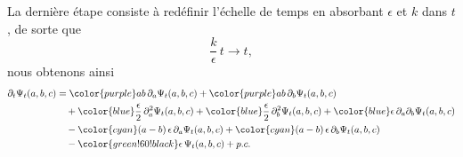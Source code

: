 \documentclass[openany,a4paper,12pt]{article}
\begin{document}
\par La dernière étape consiste à redéfinir l'échelle de temps en absorbant $\epsilon$ et $k$ dans $t$, de sorte que 
%
\begin{equation}\label{moyal_redef_temps}
	\frac{k}{\epsilon} \, t \rightarrow t,
\end{equation}
%
nous obtenons ainsi 
%
\begin{equation}\label{moyal_dev_epsilon_complet}
\begin{split}
	\partial_t \Psi_t(a,b,c) 
	&= {\color{purple} ab \, \partial_a \Psi_t(a,b,c) }
	+ {\color{purple} ab \, \partial_b \Psi_t(a,b,c) }\\
	&\quad + {\color{blue} \frac{\epsilon}{2} \, \partial_a^2 \Psi_t(a,b,c) }
	+ {\color{blue} \frac{\epsilon}{2} \, \partial_b^2 \Psi_t(a,b,c) }
	+ {\color{blue} \epsilon \, \partial_a \partial_b \Psi_t(a,b,c) }\\
	&\quad - {\color{cyan} (a-b) \,\epsilon \, \partial_a \Psi_t(a,b,c) }
	+ {\color{cyan} (a-b) \,\epsilon \, \partial_b \Psi_t(a,b,c) } \\
	&\quad- {\color{green!60!black} \epsilon \, \Psi_t(a, b, c) } 
	+ p.c.
\end{split}
\end{equation}
%
\end{document}
